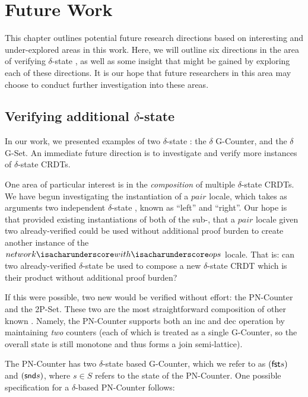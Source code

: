 \chapter{Future Work}
\label{chap:future-work}

This chapter outlines potential future research directions based on interesting
and under-explored areas in this work. Here, we will outline six directions in
the area of verifying $\delta$-state \CRDTs, as well as some insight that might
be gained by exploring each of these directions. It is our hope that future
researchers in this area may choose to conduct further investigation into these
areas.

\section{Verifying additional $\delta$-state \CRDTs}
In our work, we presented examples of two $\delta$-state \CRDTs: the $\delta$
G-Counter, and the $\delta$ G-Set. An immediate future direction is to
investigate and verify more instances of $\delta$-state CRDTs.

One area of particular interest is in the \emph{composition} of multiple
$\delta$-state CRDTs. We have begun investigating the instantiation of a $pair$
locale, which takes as arguments two independent $\delta$-state \CRDTs, known as
``left'' and ``right''. Our hope is that provided existing instantiations of
both of the sub-\CRDTs, that a $pair$ locale given two already-verified \CRDTs
could be used without additional proof burden to create another instance of the
$network{\isacharunderscore}with{\isacharunderscore}ops$ locale. That is: can
two already-verified $\delta$-state \CRDTs be used to compose a new
$\delta$-state CRDT which is their product without additional proof burden?

If this were possible, two new \CRDTs would be verified without effort: the
PN-Counter and the 2P-Set. These two \CRDTs are the most straightforward
composition of other known \CRDTs. Namely, the PN-Counter supports both an
\textsf{inc} and \textsf{dec} operation by maintaining \emph{two} counters (each
of which is treated as a single G-Counter, so the overall state is still
monotone and thus forms a join semi-lattice).

The PN-Counter has two $\delta$-state based G-Counter, which we refer to as
$(\textsf{fst} s)$ and $(\textsf{snd} s)$, where $s \in S$ refers to the state of the
PN-Counter. One possible specification for a $\delta$-based PN-Counter follows:

